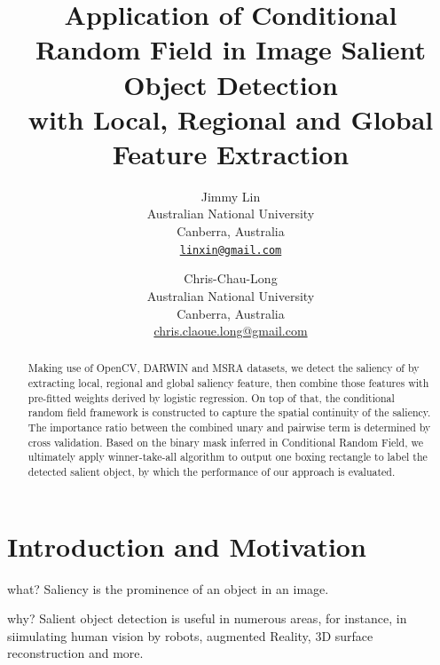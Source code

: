 \documentclass[10pt,twocolumn,letterpaper]{article}
\begin{document}
\title{Application of Conditional Random Field in Image Salient Object Detection\\ with Local, Regional and Global Feature Extraction}

\author{Jimmy Lin\\
Australian National University\\
Canberra, Australia\\
{\tt\small \url{linxin@gmail.com}}
\and
Chris-Chau-Long\\
Australian National University\\
Canberra, Australia\\
{\small\url{chris.claoue.long@gmail.com}}
}

\maketitle

\begin{abstract}
    Making use of OpenCV, DARWIN and MSRA datasets, we detect the saliency of by extracting local, 
    regional and global saliency feature, 
    then combine those features with pre-fitted weights derived by logistic regression.
    On top of that, the conditional random field framework is constructed to capture the spatial continuity of the saliency.
    The importance ratio between the combined unary and pairwise term is determined by cross validation.
    Based on the binary mask inferred in Conditional Random Field, we ultimately apply winner-take-all algorithm to 
    output one boxing rectangle to label the detected salient object, by which the performance of our 
    approach is evaluated. 
\end{abstract}

\section{Introduction and Motivation}
what? Saliency is the prominence of an object in an image.

why? Salient object detection is useful in numerous areas, for instance, in siimulating human vision by robots, augmented Reality, 3D surface reconstruction and more.
\end{document}

